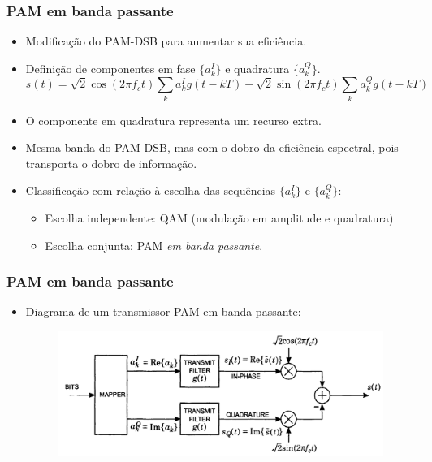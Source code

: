 \begin{frame}
	\frametitle{PAM em banda passante}

	\begin{itemize}
	  \item Modificação do PAM-DSB para aumentar sua eficiência.
	  \item Definição de componentes em fase $\{ a_k^I \}$ e quadratura $\{ a_k^Q \}$.
	  \begin{equation*}
	      s(t) = \sqrt{2} \cos(2\pi f_c t) \sum_k a_k^I g(t-kT) - \sqrt{2} \sin(2\pi f_c t) \sum_k a_k^Q g(t-kT)
	  \end{equation*}
	  \item O componente em quadratura representa um recurso extra.
	  \item Mesma banda do PAM-DSB, mas com o dobro da eficiência espectral, pois transporta o dobro de informação.
	  \item Classificação com relação à escolha das sequências $\{ a_k^I \}$ e $\{ a_k^Q \}$:
	  \begin{itemize}
	    \item Escolha independente: QAM (modulação em amplitude e quadratura)
	    \item Escolha conjunta: PAM \textit{em banda passante}.
	  \end{itemize}

	\end{itemize}	
\end{frame}

\begin{frame}
	\frametitle{PAM em banda passante}

	\begin{itemize}
	  \item Diagrama de um transmissor PAM em banda passante:
	    \begin{figure}[t]	
	      \begin{center}
		\includegraphics[width=0.9\columnwidth]{figs/pam_14}
	      \end{center}
	    \end{figure}
	\end{itemize}	
\end{frame}

